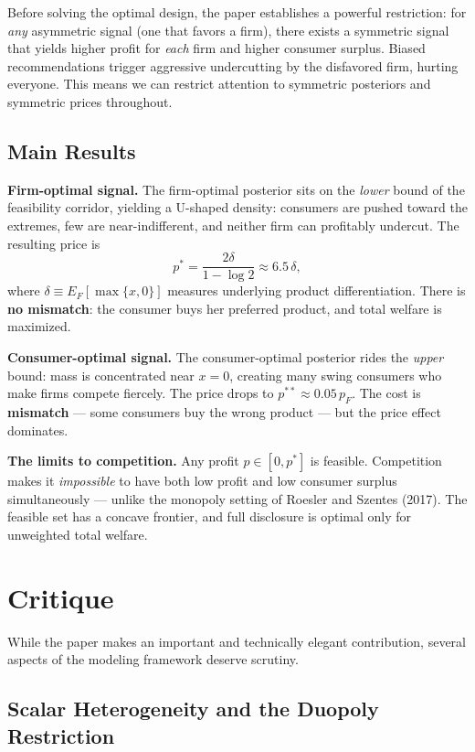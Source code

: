 \documentclass[12pt, a4paper]{article}
\begin{document}
Before solving the optimal design, the paper establishes a powerful restriction: for \emph{any} asymmetric signal (one that favors a firm), there exists a symmetric signal that yields higher profit for \emph{each} firm and higher consumer surplus. Biased recommendations trigger aggressive undercutting by the disfavored firm, hurting everyone. This means we can restrict attention to symmetric posteriors and symmetric prices throughout.

\subsection{Main Results}

\textbf{Firm-optimal signal.} The firm-optimal posterior sits on the \emph{lower} bound of the feasibility corridor, yielding a U-shaped density: consumers are pushed toward the extremes, few are near-indifferent, and neither firm can profitably undercut. The resulting price is
$$p^* = \frac{2\delta}{1 - \log 2} \approx 6.5\,\delta,$$
where $\delta \equiv E_F[\max\{x,0\}]$ measures underlying product differentiation. There is \textbf{no mismatch}: the consumer buys her preferred product, and total welfare is maximized.

\textbf{Consumer-optimal signal.} The consumer-optimal posterior rides the \emph{upper} bound: mass is concentrated near $x = 0$, creating many swing consumers who make firms compete fiercely. The price drops to $p^{**} \approx 0.05\, p_F$. The cost is \textbf{mismatch} --- some consumers buy the wrong product --- but the price effect dominates.

\textbf{The limits to competition.} Any profit $p \in [0, p^*]$ is feasible. Competition makes it \emph{impossible} to have both low profit and low consumer surplus simultaneously --- unlike the monopoly setting of Roesler and Szentes (2017). The feasible set has a concave frontier, and full disclosure is optimal only for unweighted total welfare.


\section{Critique}

While the paper makes an important and technically elegant contribution, several aspects of the modeling framework deserve scrutiny.

\subsection{Scalar Heterogeneity and the Duopoly Restriction}
\end{document}
